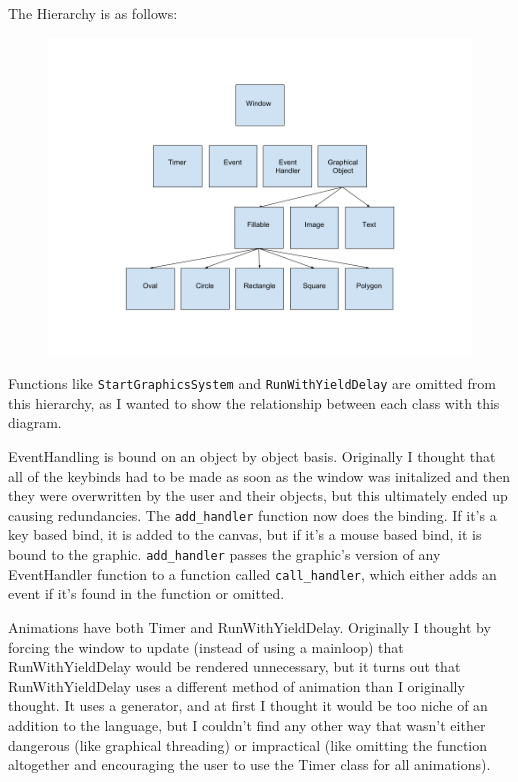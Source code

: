 \documentclass{article}
\begin{document}
The Hierarchy is as follows:

\begin{figure}[ht!]
\centering
\includegraphics[width=\textwidth]{hierarchy}
\end{figure}

Functions like \verb|StartGraphicsSystem| and \verb|RunWithYieldDelay| are omitted from this hierarchy, as I wanted to show the relationship between each class with this diagram. 

EventHandling is bound on an object by object basis. Originally I thought that all of the keybinds had to be made as soon as the window was initalized and then they were overwritten by the user and their objects, but this ultimately ended up causing redundancies. The \verb|add_handler| function now does the binding. If it's a key based bind, it is added to the canvas, but if it's a mouse based bind, it is bound to the graphic. \verb|add_handler| passes the graphic's version of any EventHandler function to a function called \verb|call_handler|, which either adds an event if it's found in the function or omitted. 

Animations have both Timer and RunWithYieldDelay. Originally I thought by forcing the window to update (instead of using a mainloop) that RunWithYieldDelay would be rendered unnecessary, but it turns out that RunWithYieldDelay uses a different method of animation than I originally thought. It uses a generator, and at first I thought it would be too niche of an addition to the language, but I couldn't find any other way that wasn't either dangerous (like graphical threading) or impractical (like omitting the function altogether and encouraging the user to use the Timer class for all animations).
\end{document}
